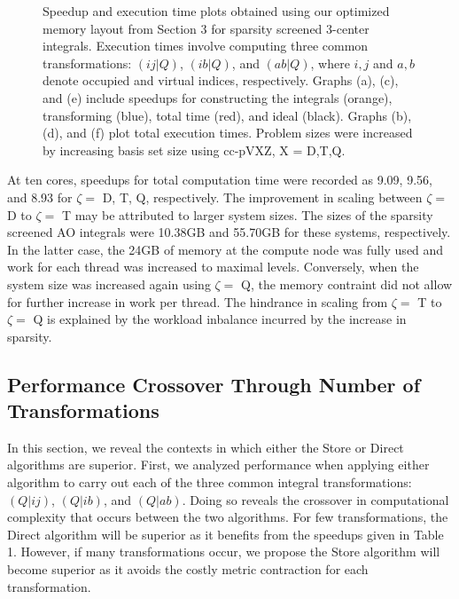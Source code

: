 \begin{figure}[H]
  \hfill
  \hfill
  \caption{Speedup and execution time plots obtained using our optimized memory layout from Section 3 for sparsity screened 3-center integrals. 
 Execution times involve computing three common transformations: $(ij|Q)$, $(ib|Q)$, and $(ab|Q)$,
 where $i,j$ and $a,b$ denote occupied and virtual indices, respectively. Graphs (a), (c), and (e) include speedups for constructing the integrals (orange),
 transforming (blue), total time (red), and ideal (black). Graphs (b), (d), and (f) plot total execution times. Problem sizes were increased by increasing basis set size
 using cc-pVXZ, X = D,T,Q.}
\end{figure}

At ten cores, speedups for total computation time were recorded as 9.09, 9.56, and 8.93 for $\zeta = $ D, T, Q, 
respectively. The improvement in scaling between $\zeta = $ D to $\zeta = $ T
may be attributed to larger system sizes. The sizes of the sparsity screened AO integrals were 10.38GB and 55.70GB 
for these systems, respectively. In the latter case,
the 24GB of memory at the compute node was fully used and work for each thread was increased to maximal levels. Conversely, 
when the system size was increased again using
$\zeta = $ Q, the memory contraint did not allow for further increase in work per thread. 
The hindrance in scaling from $\zeta = $ T to $\zeta = $ Q is explained by the workload inbalance incurred by
the increase in sparsity. 


\subsection{Performance Crossover Through Number of Transformations}

In this section, we reveal the contexts in which either the Store or Direct algorithms are superior. First, we analyzed performance when applying either algorithm
 to carry out each of the three common integral transformations: $(Q|ij)$, $(Q|ib)$, and $(Q|ab)$. Doing so reveals the crossover in computational complexity that occurs between the two
 algorithms. For few transformations, the Direct algorithm will be superior as it benefits from the speedups given
 in Table 1. However, if many transformations occur, we propose the Store algorithm will become superior as it avoids the costly metric contraction for each transformation.
 
